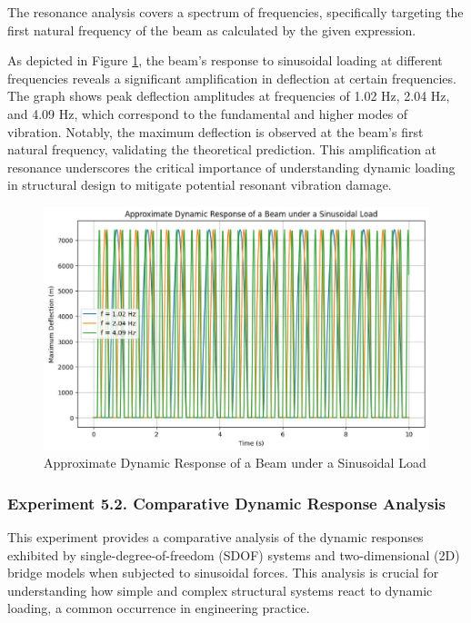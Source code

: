 \documentclass[conference]{IEEEtran}
\begin{document}
The resonance analysis covers a spectrum of frequencies, specifically targeting the first natural frequency of the beam as calculated by the given expression.

As depicted in Figure \ref{fig:beam_resonance}, the beam's response to sinusoidal loading at different frequencies reveals a significant amplification in deflection at certain frequencies. The graph shows peak deflection amplitudes at frequencies of 1.02 Hz, 2.04 Hz, and 4.09 Hz, which correspond to the fundamental and higher modes of vibration. Notably, the maximum deflection is observed at the beam's first natural frequency, validating the theoretical prediction. This amplification at resonance underscores the critical importance of understanding dynamic loading in structural design to mitigate potential resonant vibration damage.

\begin{figure}[ht]
\centering
\includegraphics[width=\linewidth]{8.jpg}
\caption{Approximate Dynamic Response of a Beam under a Sinusoidal Load}
\label{fig:beam_resonance}
\end{figure}

\subsubsection{Experiment 5.2. Comparative Dynamic Response Analysis}
This experiment provides a comparative analysis of the dynamic responses exhibited by single-degree-of-freedom (SDOF) systems and two-dimensional (2D) bridge models when subjected to sinusoidal forces. This analysis is crucial for understanding how simple and complex structural systems react to dynamic loading, a common occurrence in engineering practice.
\end{document}
